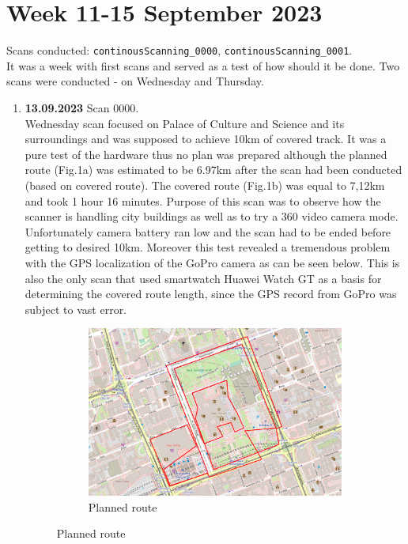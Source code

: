 \documentclass[a4paper,12pt]{book}
\begin{document}
\section{Week 11-15 September 2023}
Scans conducted: \verb|continousScanning_0000|, \verb|continousScanning_0001|.\\
It was a week with first scans and served as a test of how should it be done. Two scans were conducted - on Wednesday and Thursday.
\begin{enumerate}
	\item \textbf{13.09.2023} Scan 0000. \\
	 Wednesday scan focused on Palace of Culture and Science and its surroundings and was supposed to achieve 10km of covered track. It was a pure test of the hardware thus no plan was prepared although the planned route (Fig.1a) was estimated to be 6.97km after the scan had been conducted (based on covered route). The covered route (Fig.1b) was equal to 7,12km and took 1 hour 16 minutes. Purpose of this scan was to observe how the scanner is handling city buildings as well as to try a 360 video camera mode. Unfortunately camera battery ran low and the scan had to be ended before getting to desired 10km. Moreover this test revealed a tremendous problem with the GPS localization of the GoPro camera as can be seen below. This is also the only scan that used smartwatch Huawei Watch GT as a basis for determining the covered route length, since the GPS record from GoPro was subject to vast error.
	\begin{figure}[H]
		\centering
		\begin{subfigure}{.90\textwidth}
			\centering
			\includegraphics[width=1\linewidth]{route_p0}
			\caption{Planned route}
			\label{fig:a0}

\end{subfigure}
\end{figure}
\end{enumerate}
\end{document}
